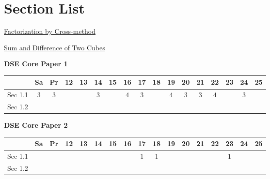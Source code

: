\documentclass[12pt, a4paper]{article}
\begin{document}
\section*{Section List}
\begin{enumx}[label=Sec 1.\arabic*\ ]
\item \hyperref[section:3-1-1]{Factorization by Cross-method}
\item \hyperref[section:3-1-2]{Sum and Difference of Two  Cubes \NF}
\end{enumx}
\begin{absolutelynopagebreak}
\begin{center}
\textbf{DSE Core Paper 1}
\end{center}
\begin{center}
\begin{tabular}{|l|c|c|c|c|c|c|c|c|c|c|c|c|c|c|c|c|}
\hline
        & Sa & Pr & 12 & 13 & 14 & 15 & 16 & 17 & 18 & 19 & 20 & 21 & 22 & 23 & 24 & 25 \\\hline\hline
Sec 1.1 &  $3$ &  $3$ &  &  &  $3$ &  &  $4$ &  $3$ &  &  $4$ &  $3$ &  $3$ &  $4$ &  &  $3$ &  \\\hline
Sec 1.2 &  &  &  &  &  &  &  &  &  &  &  &  &  &  &  &  \\\hline
\end{tabular}
\end{center}
\end{absolutelynopagebreak}
\begin{absolutelynopagebreak}
\begin{center}
\textbf{DSE Core Paper 2}
\end{center}
\begin{center}
\begin{tabular}{|l|c|c|c|c|c|c|c|c|c|c|c|c|c|c|c|c|}
\hline
        & Sa & Pr & 12 & 13 & 14 & 15 & 16 & 17 & 18 & 19 & 20 & 21 & 22 & 23 & 24 & 25 \\\hline\hline
Sec 1.1 &  &  &  &  &  &  &  &  $1$ &  $1$ &  &  &  &  &  $1$ &  &  \\\hline
Sec 1.2 &  &  &  &  &  &  &  &  &  &  &  &  &  &  &  &  \\\hline
\end{tabular}
\end{center}
\end{absolutelynopagebreak}
\end{document}
